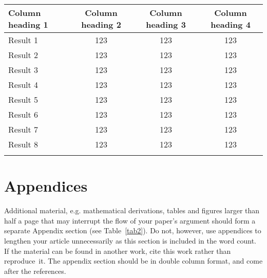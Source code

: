 \documentclass{cta-author}
\begin{document}
\begin{table}[!h]
{\begin{tabular*}{\textwidth}{@{\extracolsep{\fill}}lccc}\toprule
Column heading 1 &Column heading 2 & Column heading 3  & Column heading 4\\
\midrule
Result 1 &123 &123 & 123 \\
Result 2 &123 &123 &123 \\
Result 3 &123 &123 &123 \\
Result 4 &123 &123 &123 \\
Result 5 &123 &123 &123 \\
Result 6 &123 &123 &123 \\
Result 7 &123 &123 &123 \\
Result 8 &123 &123 &123 \\
\botrule
\end{tabular*}}{}
\end{table}

\vfill\pagebreak

\section{Appendices}\label{sec14}

Additional material, e.g. mathematical derivations, tables and figures
larger than half a page that may interrupt the flow of your paper's argument
should form a separate Appendix section (see Table~\ref{tab2}). Do not, however, use
appendices to lengthen your article unnecessarily as this section is
included in the word count. If the material can be found in another work,
cite this work rather than reproduce~it.
The appendix section should be in double column format, and come after the references.
\end{document}
